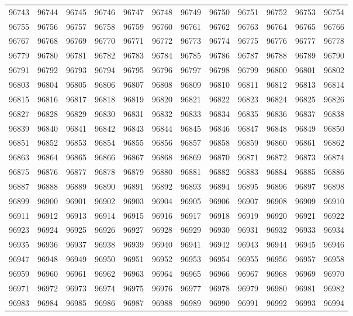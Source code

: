 \begin{center}
\begin{longtable}{llllllllllll}
96743 &96744 &96745 &96746 &96747 &96748 &96749 &96750 &96751 &96752 &96753 &96754 \\
96755 &96756 &96757 &96758 &96759 &96760 &96761 &96762 &96763 &96764 &96765 &96766 \\
96767 &96768 &96769 &96770 &96771 &96772 &96773 &96774 &96775 &96776 &96777 &96778 \\
96779 &96780 &96781 &96782 &96783 &96784 &96785 &96786 &96787 &96788 &96789 &96790 \\
96791 &96792 &96793 &96794 &96795 &96796 &96797 &96798 &96799 &96800 &96801 &96802 \\
96803 &96804 &96805 &96806 &96807 &96808 &96809 &96810 &96811 &96812 &96813 &96814 \\
96815 &96816 &96817 &96818 &96819 &96820 &96821 &96822 &96823 &96824 &96825 &96826 \\
96827 &96828 &96829 &96830 &96831 &96832 &96833 &96834 &96835 &96836 &96837 &96838 \\
96839 &96840 &96841 &96842 &96843 &96844 &96845 &96846 &96847 &96848 &96849 &96850 \\
96851 &96852 &96853 &96854 &96855 &96856 &96857 &96858 &96859 &96860 &96861 &96862 \\
96863 &96864 &96865 &96866 &96867 &96868 &96869 &96870 &96871 &96872 &96873 &96874 \\
96875 &96876 &96877 &96878 &96879 &96880 &96881 &96882 &96883 &96884 &96885 &96886 \\
96887 &96888 &96889 &96890 &96891 &96892 &96893 &96894 &96895 &96896 &96897 &96898 \\
96899 &96900 &96901 &96902 &96903 &96904 &96905 &96906 &96907 &96908 &96909 &96910 \\
96911 &96912 &96913 &96914 &96915 &96916 &96917 &96918 &96919 &96920 &96921 &96922 \\
96923 &96924 &96925 &96926 &96927 &96928 &96929 &96930 &96931 &96932 &96933 &96934 \\
96935 &96936 &96937 &96938 &96939 &96940 &96941 &96942 &96943 &96944 &96945 &96946 \\
96947 &96948 &96949 &96950 &96951 &96952 &96953 &96954 &96955 &96956 &96957 &96958 \\
96959 &96960 &96961 &96962 &96963 &96964 &96965 &96966 &96967 &96968 &96969 &96970 \\
96971 &96972 &96973 &96974 &96975 &96976 &96977 &96978 &96979 &96980 &96981 &96982 \\
96983 &96984 &96985 &96986 &96987 &96988 &96989 &96990 &96991 &96992 &96993 &96994 \\

\end{longtable}
\end{center}
